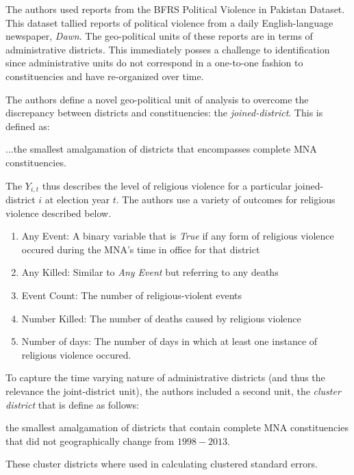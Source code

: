 \documentclass{scrartcl}
\begin{document}
The authors used reports from the BFRS Political Violence in Pakistan Dataset. This dataset tallied reports of political violence from a daily English-language newspaper, \textit{Dawn}. The geo-political units of these reports are in terms of administrative districts. This immediately posses a challenge to identification since administrative units do not correspond in a one-to-one fashion to constituencies and have re-organized over time.

The authors define a novel geo-political unit of analysis to overcome the discrepancy between districts and constituencies: the \textit{joined-district}. 
This is defined as:
\begin{displayquote}
...the smallest amalgamation of districts that encompasses complete MNA constituencies. 
\end{displayquote}

The $Y_{i,t}$ thus describes the level of religious violence for a particular joined-district $i$ at election year $t$. The authors use a variety of outcomes for religious violence described below. 

\begin{enumerate}
\item Any Event: A binary variable that is \textit{True} if any form of religious violence occured during the MNA's time in office for that district
\item Any Killed: Similar to \textit{Any Event} but referring to any deaths
\item Event Count: The number of religious-violent events
\item Number Killed: The number of deaths caused by religious violence
\item Number of days: The number of days in which at least one instance of religious violence occured.
\end{enumerate}

To capture the time varying nature of administrative districts (and thus the relevance the joint-district unit), the authors included a second unit, the \textit{cluster district} that is define as follows:

\begin{displayquote}
  the smallest amalgamation of districts that contain complete MNA constituencies that did not geographically change from $1998 - 2013$.
\end{displayquote}

These cluster districts where used in calculating clustered standard errors.
\end{document}
